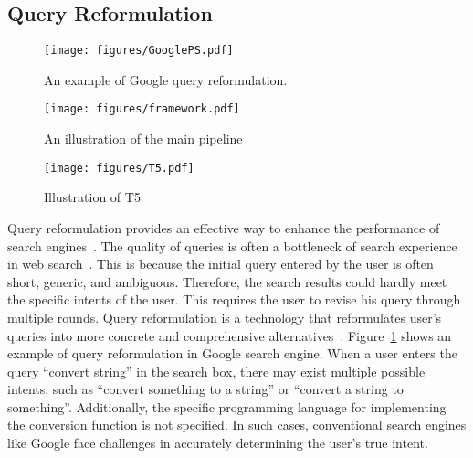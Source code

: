 \documentclass[sigconf,screen]{acmart}
\newcommand{\ourmethod}{\textit{SSQR}\xspace}
\newcommand{\wan}[1]{\textcolor{cyan!70!blue}{[Wan: #1]}}
\begin{document}
\subsection{Query Reformulation}
\begin{figure}
 \centering
  \texttt{[image: figures/GooglePS.pdf]}
  \caption{An example of Google query reformulation.}
  \label{fig:QueryReformulationExample}
\end{figure}

\begin{figure*}[ht]
 \centering
  \texttt{[image: figures/framework.pdf]}
  \caption{An illustration of the main pipeline}
  \label{fig:framework}
\end{figure*}

 \begin{figure}[h]
 \centering
  \texttt{[image: figures/T5.pdf]}
  \caption{Illustration of T5}
  \label{fig:T5Structure}
\end{figure}

Query reformulation provides an effective way to enhance the performance of search engines~\cite{zhu2022lol,li2022cooperative,chen2021towards}. 
The quality of queries is often a bottleneck of search experience in web search~\cite{chen2021towards}. This is because the initial query entered by the user is often short, generic, and ambiguous. Therefore, the search results could hardly meet the specific intents of the user. This requires the user to revise his query through multiple rounds. Query reformulation is a technology that reformulates user's queries into more concrete and comprehensive alternatives~\cite{huang2009analyzing}.
Figure~\ref{fig:QueryReformulationExample} shows an example of query reformulation in Google search engine. When a user enters the query ``convert string'' in the search box, there may exist multiple possible intents, such as ``convert something to a string'' or ``convert a string to something''. Additionally, the specific programming language for implementing the conversion function is not specified. In such cases, conventional search engines like Google face challenges in accurately determining the user's true intent. 
\end{document}
